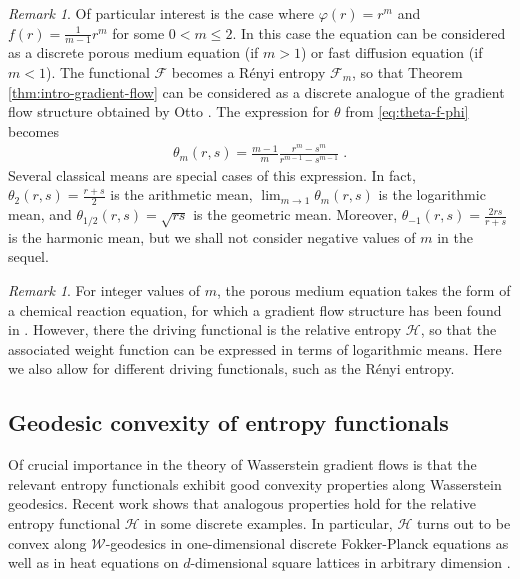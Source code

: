 \documentclass[a4paper,11pt,reqno]{amsart}
\theoremstyle{plain}
\theoremstyle{remark}
\newtheorem{remark}[theorem]{Remark}
\numberwithin{equation}{section}
\begin{document}
\begin{remark}\label{rem:power-mean}
  Of particular interest is the case where ${\varphi}(r)=r^m$ and $f(r) =
  \frac{1}{m-1}r^m$ for some $0 < m \leq 2$. In this case the equation
  can be considered as a discrete porous medium equation (if $m > 1$)
  or fast diffusion equation (if $m < 1$). The functional ${\mathcal{F}}$
  becomes a R\'enyi entropy ${\mathcal{F}}_m$, so that Theorem
  \ref{thm:intro-gradient-flow} can be considered as a discrete
  analogue of the gradient flow structure obtained by Otto \cite{O01}.
  The expression for $\theta$ from \eqref{eq:theta-f-phi} becomes
\begin{align}\label{eq:power-mean}
\theta_m(r,s) = \frac{m-1}{m}\frac{r^m - s^m}{r^{m-1} - s^{m-1}}\;.
\end{align}
Several classical means are special cases of this expression.  In
fact, $\theta_2(r,s)= \frac{r+s}{2}$ is the arithmetic mean, $\lim_{m
  \to 1}\theta_m(r,s)$ is the logarithmic mean, and $\theta_{1/2}(r,s)
= \sqrt{rs}$ is the geometric mean.  Moreover, $\theta_{-1}(r,s) =
\frac{2rs}{r+s}$ is the harmonic mean, but we shall not consider
negative values of $m$ in the sequel.
\end{remark}

\begin{remark}\label{rem:reaction}
  For integer values of $m$, the porous medium equation takes the form
  of a chemical reaction equation, for which a gradient flow structure
  has been found in \cite{Mie11a}. However, there the driving
  functional is the relative entropy ${\mathcal{H}}$, so that the associated
  weight function can be expressed in terms of logarithmic means. Here
  we also allow for different driving functionals, such as the R\'enyi
  entropy.
\end{remark}

\subsection{Geodesic convexity of entropy functionals}
Of crucial importance in the theory of Wasserstein gradient flows is
that the relevant entropy functionals exhibit good convexity
properties along Wasserstein geodesics. Recent work \cite{EM11,Mie11b}
shows that analogous properties hold for the relative entropy
functional ${\mathcal{H}}$ in some discrete examples. In particular, ${\mathcal{H}}$ turns
out to be convex along ${\mathcal{W}}$-geodesics in one-dimensional discrete
Fokker-Planck equations \cite{Mie11b} as well as in heat equations on
$d$-dimensional square lattices in arbitrary dimension \cite{EM11}.
\end{document}
